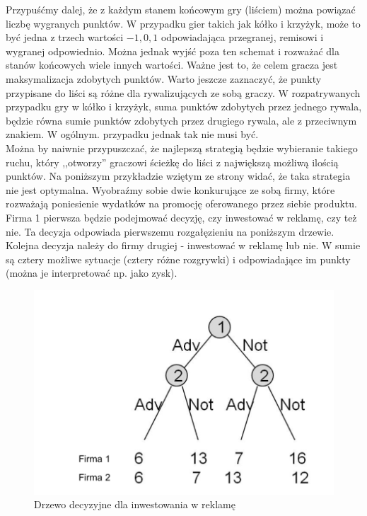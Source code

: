 \documentclass[licencjacka]{pracamgr}
\begin{document}
Przypuśćmy dalej, że z każdym stanem końcowym gry (liściem) można powiązać liczbę wygranych punktów. W przypadku gier takich jak kółko i krzyżyk, może to być jedna z trzech wartości ${-1, 0, 1}$  odpowiadająca przegranej, remisowi i wygranej odpowiednio.  Można jednak wyjść poza ten schemat i rozważać dla stanów końcowych wiele innych wartości.  Ważne jest to, że celem gracza jest maksymalizacja zdobytych punktów. Warto jeszcze zaznaczyć, że punkty przypisane do liści są różne dla rywalizujących ze sobą graczy. W rozpatrywanych  przypadku gry w kółko i krzyżyk, suma punktów zdobytych przez jednego rywala, będzie równa sumie punktów zdobytych przez drugiego rywala, ale z przeciwnym znakiem.  W ogólnym. przypadku jednak tak nie musi być. \\

 Można by naiwnie przypuszczać, że najlepszą strategią będzie wybieranie takiego ruchu, który ,,otworzy'' graczowi ścieżkę do liści z największą możliwą ilością punktów.  Na poniższym przykładzie wziętym ze strony \cite{Game} widać, że taka strategia nie jest optymalna. Wyobraźmy sobie dwie konkurujące ze sobą firmy, które rozważają poniesienie wydatków na promocję oferowanego przez siebie produktu. Firma 1 pierwsza będzie podejmować decyzję, czy inwestować w reklamę, czy też nie.  Ta decyzja odpowiada pierwszemu rozgałęzieniu na poniższym drzewie. Kolejna decyzja  należy do firmy drugiej - inwestować w reklamę lub nie. W sumie są cztery możliwe sytuacje (cztery różne rozgrywki) i odpowiadające im punkty (można je interpretować np. jako zysk). \\

\begin{center}
	\begin{figure}[h!]
	\includegraphics [scale=0.30] {advertise.png}
	\caption{Drzewo decyzyjne dla inwestowania w reklamę}
	\label{Rys2}
	\end{figure}
\end{center}
 
\end{document}
